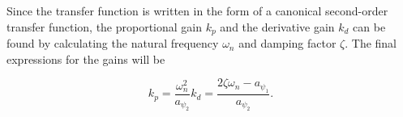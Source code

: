 Since the transfer function is written in the form of a canonical second-order transfer function, the proportional gain $k_p$ and the derivative gain $k_d$ can be found by calculating the natural frequency $\omega_n$ and damping factor $\zeta$. The final expressions for the gains will be

\begin{subequations}
\begin{equation}
	\label{eq:controller_kp}
	k_p = \frac{\omega_n^2}{a_{\psi_2}}
\end{equation}
\begin{equation}
	k_d = \frac{2\zeta\omega_n - a_{\psi_1}}{a_{\psi_2}}.
\end{equation}
\end{subequations}


